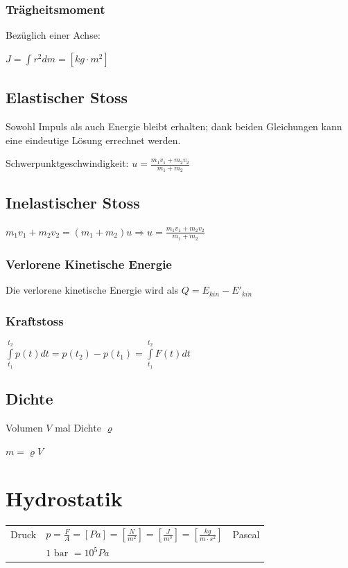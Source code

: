 \documentclass[a4paper]{scrartcl}
\begin{document}
\subsubsection{Trägheitsmoment}

	
	Bezüglich einer Achse:
	
	$J = \int r^2 d m = \left[ kg \cdot m^2 \right]$

\subsection{Elastischer Stoss}
	Sowohl Impuls als auch Energie bleibt erhalten; dank beiden Gleichungen kann eine eindeutige Lösung errechnet werden.
	
	Schwerpunktgeschwindigkeit: $u = \frac{m_1 v_1 + m_2 v_2}{m_1 + m_2}$ %


\subsection{Inelastischer Stoss}

	$m_1 v_1 + m_2 v_2 = (m_1 + m_2) u \Rightarrow u = \frac{m_1 v_1 + m_2 v_2}{m_1 + m_2}$

\subsubsection{Verlorene Kinetische Energie}

	Die verlorene kinetische Energie wird als $Q = E_{kin}  - E'_{kin}$

\subsubsection{Kraftstoss}

	$\int\limits^{t_2}_{t_1} p(t) dt = p(t_2) - p(t_1) = \int\limits^{t_2}_{t_1} F(t) dt$


\subsection{Dichte}

	Volumen $V$ mal Dichte $\varrho$
	 
	$m = \varrho V$

\section{Hydrostatik}
	\begin{tabu} {l X l}
		\hline
		Druck
		&	$p = \frac{F}{A} = \left[ Pa \right] = \left[ \frac{N}{m^2} \right] = \left[ \frac{J}{m^3} \right] = \left[ \frac{kg}{m \cdot s^2} \right]$
		&	Pascal \\
		& $1 \text{ bar } = 10^5 Pa$
		\\ \hline
	\end{tabu}
\end{document}
